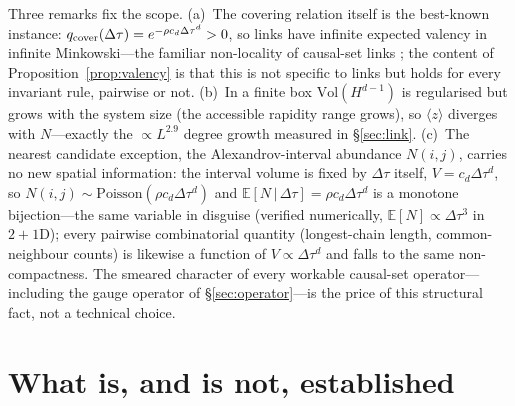 \documentclass[aps,prd,reprint,nofootinbib,superscriptaddress,floatfix]{revtex4-2}
\begin{document}
Three remarks fix the scope. (a)~The covering relation itself is the best-known
instance: $q_{\rm cover}(\Delta\tau)=e^{-\rho c_d\Delta\tau^d}>0$, so links have
infinite expected valency in infinite Minkowski---the familiar non-locality of
causal-set links \cite{Sorkin2007,BenincasaDowker2010}; the content of
Proposition~\ref{prop:valency} is that this is not specific to links but holds for
every invariant rule, pairwise or not. (b)~In a finite box $\mathrm{Vol}(H^{d-1})$ is
regularised but grows with the system size (the accessible rapidity range grows), so
$\langle z\rangle$ diverges with $N$---exactly the $\propto L^{2.9}$ degree growth
measured in \S\ref{sec:link}. (c)~The nearest candidate exception, the
Alexandrov-interval abundance $N(i,j)$, carries no new spatial information: the interval
volume is fixed by $\Delta\tau$ itself, $V=c_d\Delta\tau^d$, so
$N(i,j)\sim\mathrm{Poisson}(\rho c_d\Delta\tau^d)$ and
$\mathbb{E}[N\,|\,\Delta\tau]=\rho c_d\Delta\tau^d$ is a monotone bijection---the same
variable in disguise (verified numerically, $\mathbb{E}[N]\propto\Delta\tau^3$ in
$2{+}1$D); every pairwise combinatorial quantity (longest-chain length, common-neighbour
counts) is likewise a function of $V\propto\Delta\tau^d$ and falls to the same
non-compactness. The smeared character of every workable causal-set
operator---including the gauge operator of \S\ref{sec:operator}---is the price of this
structural fact, not a technical choice.

\section{What is, and is not, established}\label{sec:claim}
\end{document}
